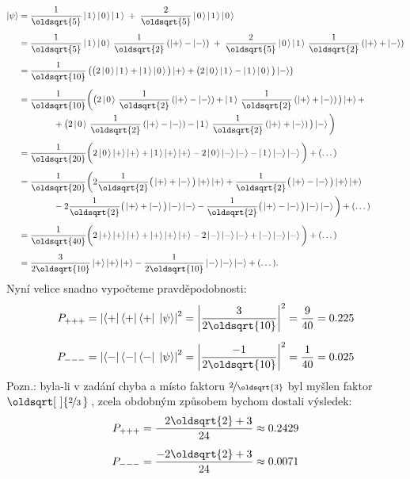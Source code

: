 \documentclass[10pt,a4paper]{article}
\renewcommand*{\sqrt}[2][\ ]{\oldsqrt[#1]{#2\,}\,}
\def\ph{\phantom}
\newcommand*{\mask}[2]{%
    \mathord{\makebox[\widthof{\(#1\)}]{\(#2\)}}%
}
\newcommand{\bra}[1]{\left< #1 \right|}
\newcommand{\ket}[1]{\left| #1 \right>}
\def\kzero{\ket{\mask{+}{0}}}
\def\kone{\ket{\mask{+}{1}}}
\def\kplus{\ket{+}}
\def\kminus{\ket{-}}
\begin{document}
\begin{align*}
    \ket{\psi}
    &= \frac{1}{\oldsqrt{5}} \kone\kzero\kone
    \;+\; \frac{2}{\oldsqrt{5}} \kzero\kone\kzero
    \\[5pt]
    &= \frac{1}{\oldsqrt{5}} \kone\kzero \, \frac{1}{\oldsqrt{2}} \left(\kplus - \kminus\right)
    \;+\; \frac{2}{\oldsqrt{5}} \kzero\kone \, \frac{1}{\oldsqrt{2}} \left(\kplus + \kminus\right)
    \\[5pt]
    &= \frac{1}{\oldsqrt{10}} \left(
        \big( 2\kzero\kone + \kone\kzero \big)\kplus +
        \big( 2\kzero\kone - \kone\kzero \big)\kminus
    \right)
    \\[5pt]
    &= \frac{1}{\oldsqrt{10}} \bigg(
        \big( 2\kzero\, \frac{1}{\oldsqrt{2}} \left(\kplus - \kminus\right) + \kone\, \frac{1}{\oldsqrt{2}} \left(\kplus + \kminus\right) \big)\kplus +
        \\ &\hspace{4em}
        + \big( 2\kzero\, \frac{1}{\oldsqrt{2}} \left(\kplus - \kminus\right) - \kone\, \frac{1}{\oldsqrt{2}} \left(\kplus + \kminus\right) \big)\kminus
    \bigg)
    \\[5pt]
    &= \frac{1}{\oldsqrt{20}} \bigg(
        2 \kzero\kplus\kplus + \kone\kplus\kplus
        - 2 \kzero\kminus\kminus - \kone\kminus\kminus
    \bigg) + (\dots)
    \\[5pt]
    &= \frac{1}{\oldsqrt{20}} \bigg(
        2 \frac{1}{\oldsqrt{2}} \big(\kplus + \kminus\big)\kplus\kplus
        + \frac{1}{\oldsqrt{2}} \big(\kplus - \kminus\big)\kplus\kplus
        \\ &\hspace{4em}
        - 2 \frac{1}{\oldsqrt{2}} \big(\kplus + \kminus\big)\kminus\kminus
        - \frac{1}{\oldsqrt{2}} \big(\kplus - \kminus\big)\kminus\kminus
    \bigg) + (\dots)
    \\[5pt]
    &= \frac{1}{\oldsqrt{40}} \bigg(
        2 \kplus\kplus\kplus + \kplus\kplus\kplus
        - 2\kminus\kminus\kminus + \kminus\kminus\kminus
    \bigg) + (\dots)
    \\[5pt]
    &= \frac{3}{2\oldsqrt{10}} \kplus\kplus\kplus
    - \frac{1}{2\oldsqrt{10}} \kminus\kminus\kminus
    + (\dots).
\end{align*}
\endgroup
Nyní velice snadno vypočteme pravděpodobnosti:
\begin{align*}
    P_{+++}
    &= \left| \bra{+}\bra{+}\bra{+} \; \ket{\psi}\right|^2
    = \left| \frac{3}{2\oldsqrt{10}} \right|^2
    = \frac{9}{40} = 0.225
    \\[5pt]
    P_{---}
    &= \left| \bra{-}\bra{-}\bra{-} \; \ket{\psi}\right|^2
    = \left| \frac{-1}{2\oldsqrt{10}} \right|^2
    = \frac{1}{40} = 0.025
\end{align*}
Pozn.: byla-li v zadání chyba a místo faktoru $\nicefrac{2}{\oldsqrt{3}}$ byl myšlen faktor $\sqrt{\nicefrac{2}{3}}$, zcela obdobným způsobem bychom dostali výsledek:
\begin{align*}
    P_{+++} &= \frac{\ph{-}2\oldsqrt{2} + 3}{24} \approx 0.2429
    \\[5pt]
    P_{---} &= \frac{-2\oldsqrt{2} + 3}{24} \approx 0.0071
\end{align*}
\end{document}
